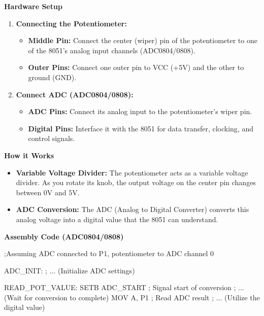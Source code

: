 \documentclass[
]{article}
\newenvironment{Shaded}{}{}
\newcommand{\NormalTok}[1]{#1}
\begin{document}
\textbf{Hardware Setup}

\begin{enumerate}
\def\labelenumi{\arabic{enumi}.}
\item
  \textbf{Connecting the Potentiometer:}

  \begin{itemize}
  \item
    \textbf{Middle Pin:} Connect the center (wiper) pin of the
    potentiometer to one of the 8051's analog input channels
    (ADC0804/0808).
  \item
    \textbf{Outer Pins:} Connect one outer pin to VCC (+5V) and the
    other to ground (GND).
  \end{itemize}
\item
  \textbf{Connect ADC (ADC0804/0808):}

  \begin{itemize}
  \item
    \textbf{ADC Pins:} Connect its analog input to the potentiometer's
    wiper pin.
  \item
    \textbf{Digital Pins:} Interface it with the 8051 for data transfer,
    clocking, and control signals.
  \end{itemize}
\end{enumerate}

\textbf{How it Works}

\begin{itemize}
\item
  \textbf{Variable Voltage Divider:} The potentiometer acts as a
  variable voltage divider. As you rotate its knob, the output voltage
  on the center pin changes between 0V and 5V.
\item
  \textbf{ADC Conversion:} The ADC (Analog to Digital Converter)
  converts this analog voltage into a digital value that the 8051 can
  understand.
\end{itemize}

\textbf{Assembly Code (ADC0804/0808)}

\begin{Shaded}
\begin{Highlighting}[]
\NormalTok{;Assuming ADC connected to P1, potentiometer to ADC channel 0}

\NormalTok{ADC\_INIT:}
\NormalTok{    ; ... (Initialize ADC settings)}

\NormalTok{READ\_POT\_VALUE:}
\NormalTok{    SETB ADC\_START  ; Signal start of conversion}
\NormalTok{    ; ... (Wait for conversion to complete)}
\NormalTok{    MOV A, P1       ; Read ADC result}
\NormalTok{    ; ... (Utilize the digital value)}
\end{Highlighting}
\end{Shaded}
\end{document}
